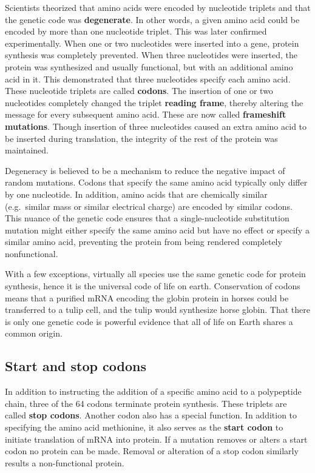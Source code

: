 \documentclass[
]{book}
\begin{document}
Scientists theorized that amino acids were encoded by nucleotide triplets and that the genetic code was \textbf{degenerate}. In other words, a given amino acid could be encoded by more than one nucleotide triplet. This was later confirmed experimentally. When one or two nucleotides were inserted into a gene, protein synthesis was completely prevented. When three nucleotides were inserted, the protein was synthesized and usually functional, but with an additional amino acid in it. This demonstrated that three nucleotides specify each amino acid. These nucleotide triplets are called \textbf{codons}. The insertion of one or two nucleotides completely changed the triplet \textbf{reading frame}, thereby altering the message for every subsequent amino acid. These are now called \textbf{frameshift mutations}. Though insertion of three nucleotides caused an extra amino acid to be inserted during translation, the integrity of the rest of the protein was maintained.

Degeneracy is believed to be a mechanism to reduce the negative impact of random mutations. Codons that specify the same amino acid typically only differ by one nucleotide. In addition, amino acids that are chemically similar (e.g.~similar mass or similar electrical charge) are encoded by similar codons. This nuance of the genetic code ensures that a single-nucleotide substitution mutation might either specify the same amino acid but have no effect or specify a similar amino acid, preventing the protein from being rendered completely nonfunctional.

With a few exceptions, virtually all species use the same genetic code for protein synthesis, hence it is the universal code of life on earth. Conservation of codons means that a purified mRNA encoding the globin protein in horses could be transferred to a tulip cell, and the tulip would synthesize horse globin. That there is only one genetic code is powerful evidence that all of life on Earth shares a common origin.

\hypertarget{start-and-stop-codons}{%
\subsection{Start and stop codons}\label{start-and-stop-codons}}

In addition to instructing the addition of a specific amino acid to a polypeptide chain, three of the 64 codons terminate protein synthesis. These triplets are called \textbf{stop codons}. Another codon also has a special function. In addition to specifying the amino acid methionine, it also serves as the \textbf{start codon} to initiate translation of mRNA into protein. If a mutation removes or alters a start codon no protein can be made. Removal or alteration of a stop codon similarly results a non-functional protein.
\end{document}
